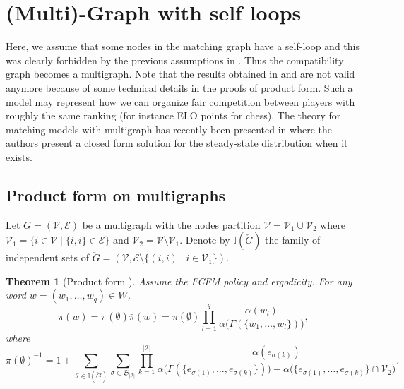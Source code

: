 \documentclass{llncs}
\newtheorem{theo}      {Theorem}
\begin{document}
\section{(Multi)-Graph with self loops} 

Here, we assume that some 
nodes in the matching graph
have a self-loop and this was clearly forbidden by the previous assumptions in \cite{MaMo18}. Thus the compatibility graph becomes
a multigraph. 
Note that the results obtained in  \cite{MBMa21} and  \cite{MaMo18} are not valid anymore because of some technical details in 
the proofs of product form.  Such a model may represent how we can organize fair competition between players with roughly the same ranking (for instance ELO points 
for chess).  
The theory for matching models with multigraph 
has recently been presented in \cite{BMMR20} where the authors present a closed form solution for the steady-state distribution when it exists. 

\subsection{Product form on multigraphs}
Let $G=(\mathcal{V}, \mathcal{E})$ be a multigraph with the nodes partition $\mathcal{V}=\mathcal{V}_1\cup\mathcal{V}_2$ where $\mathcal{V}_1=\{i\in \mathcal{V}\mid \{i,i\}\in \mathcal{E}\}$ and $\mathcal{V}_2 = \mathcal{V}\setminus \mathcal{V}_1$. Denote by $\mathbb{I} (\check{G})$ the family of independent sets of 
$\check{G}=(\mathcal{V},\mathcal{E}\setminus\{(i,i)\mid i\in\mathcal{V}_1\})$.

\begin{theo}[Product form {\cite[Theorem 4.5]{BMMR20}}]\label{th:prod-multi}
Assume the FCFM policy and ergodicity.  
For any word $w=(w_1,\dots,w_q)\in W$,
\begin{equation}
\pi(w)= \pi({\emptyset}) \bar{\pi}(w)  =  \pi({\emptyset}) \prod_{l=1}^{q}\frac{\alpha(w_l)}{\alpha\bigl(\Gamma(\{w_1,\dots,w_l\})\bigr)},
\end{equation}
where
\[
\pi({\emptyset})^{-1}=1+\sum_{\mathcal{I}\in\mathbb{I}(\check{G})}\sum_{\sigma\in \mathfrak{S}_{|\mathcal{I}|}}
\prod_{k=1}^{|\mathcal{I}|}
\frac{\alpha(e_{\sigma(k)})}{
\alpha\bigl(\Gamma(\{e_{\sigma(1)},\dots,e_{\sigma(k)}\})\bigr)-\alpha\bigl(\{e_{\sigma(1)},\dots,e_{\sigma(k)}\}\cap \mathcal{V}_2\bigr)}. \]
\end{theo} 
\end{document}
